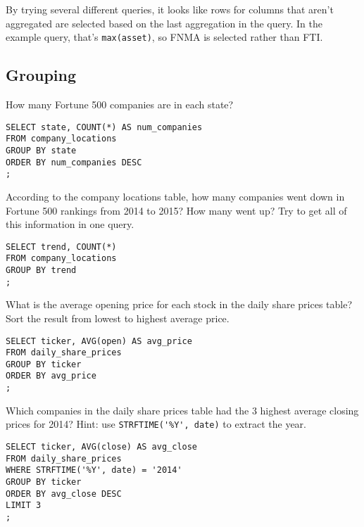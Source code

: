 \documentclass[10pt]{exam}
\begin{document}
\begin{questions}
\begin{solution}
By trying several different queries, it looks like rows for columns that aren't
aggregated are selected based on the last aggregation in the query. In the
example query, that's \lstinline{max(asset)}, so FNMA is selected rather than
FTI.
\end{solution}



\subsection*{Grouping}

\question How many Fortune 500 companies are in each state?

\begin{solution}
\begin{lstlisting}
SELECT state, COUNT(*) AS num_companies
FROM company_locations
GROUP BY state
ORDER BY num_companies DESC
;
\end{lstlisting}
\end{solution}


\question According to the company locations table, how many companies went
down in Fortune 500 rankings from 2014 to 2015? How many went up? Try to get
all of this information in one query.

\begin{solution}
\begin{lstlisting}
SELECT trend, COUNT(*)
FROM company_locations
GROUP BY trend
;
\end{lstlisting}
\end{solution}


\question What is the average opening price for each stock in the daily share
prices table? Sort the result from lowest to highest average price.

\begin{solution}
\begin{lstlisting}
SELECT ticker, AVG(open) AS avg_price
FROM daily_share_prices
GROUP BY ticker
ORDER BY avg_price
;
\end{lstlisting}
\end{solution}


\question Which companies in the daily share prices table had the 3 highest
average closing prices for 2014? Hint: use \lstinline{STRFTIME('%Y', date)} to
extract the year.

\begin{solution}
\begin{lstlisting}
SELECT ticker, AVG(close) AS avg_close
FROM daily_share_prices
WHERE STRFTIME('%Y', date) = '2014'
GROUP BY ticker
ORDER BY avg_close DESC
LIMIT 3
;
\end{lstlisting}
\end{solution}




\end{questions}
\end{document}
